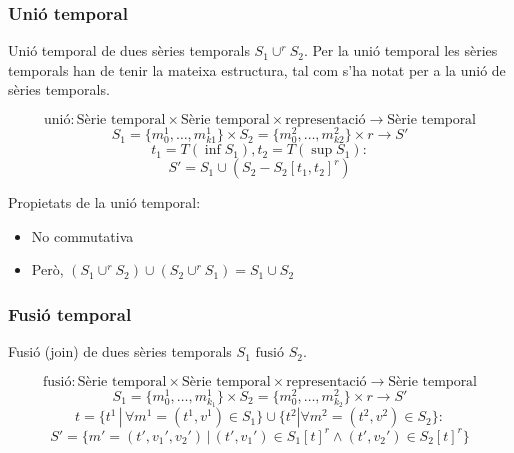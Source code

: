 \subsubsection{Unió temporal}

Unió temporal de dues sèries temporals $S_1 \cup^r S_2$. Per la unió temporal les sèries temporals han de tenir la mateixa estructura, tal com s'ha notat per a la unió de sèries temporals.

\begin{definition}
  \[
  \text{unió}: \text{Sèrie temporal} \times \text{Sèrie temporal}
  \times \text{representació} \longrightarrow \text{Sèrie temporal}
  \]
  \[
  S_1 = \{m_0^1 , \ldots , m_{k1}^1\}  \times S_2 = \{m_0^2 , \ldots , m_{k2}^2\} \times r \longrightarrow S'
  \]
  \[
  t_1=T(\inf S_1), t_2=T(\sup S_1):
  \]
  \[
  S' = S_1 \cup  ( S_2 - S_2[t_1,t_2]^r )
  \] 
\end{definition}



Propietats de la unió temporal:
\begin{itemize}
\item No commutativa
\item Però, $(S_1 \cup^r S_2) \cup (S_2 \cup^r S_1) = S_1 \cup S_2$
\end{itemize}




\subsubsection{Fusió temporal}

Fusió (join) de dues sèries temporals $S_1 \text{ fusió } S_2$.


\begin{definition}
  \[
  \text{fusió}: \text{Sèrie temporal} \times
  \text{Sèrie temporal} \times \text{representació} \longrightarrow
  \text{Sèrie temporal}
  \]
  \[
  S_1 = \{m_0^1 , \ldots , m_{k_1}^1\} \times S_2 = \{m_0^2 , \ldots ,
  m_{k_2}^2\} \times r \longrightarrow S'
  \]
  \[
  t = \{t^1 \, | \, \forall m^1=(t^1,v^1) \in S_1\} \cup \{t^2 | \forall
  m^2=(t^2,v^2) \in S_2\}:
  \]
  \[
  S' = \{m'=(t',v_1',v_2') \, | \, (t',v_1') \in S_1[t]^r \wedge (t',v_2') \in S_2[t]^r \} 
  \]
\end{definition}



